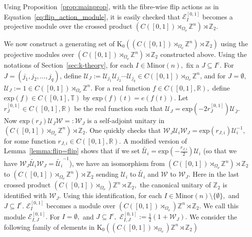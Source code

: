 \documentclass[9pt, BCOR=2mm]{amsart}
\numberwithin{equation}{section}
\numberwithin{equation}{section}
\newcommand{\Z}{{\mathbb{Z}}}
\newcommand{\R}{{\mathbb{R}}}
\newcommand{\T}{{\mathbb{T}}}
\newcommand{\K}{\mathrm{K}} %
\begin{document}
  
  
  Using Proposition~\ref{prop:mainprop}, with the fibre-wise flip actions as in Equation~\ref{eq:flip_action_module}, it is easily checked that $\mathcal{E}_{I}^{[0,1]}$ becomes a projective module over the crossed product $(C([0,1])\rtimes_{ \Omega_{\nu}} \Z^n)\rtimes \Z_2.$      
  
We now construct a generating set of $\K_0((C([0,1])\rtimes_{ \Omega_{\nu}} \Z^n)\rtimes \Z_2)$ using the projective modules over $(C([0,1])\rtimes_{ \Omega_{\nu}} \Z^n)\rtimes \Z_2$ constructed above. Using the notations of Section~\ref{sec:k-theory}, for each $I\in \mathrm{Minor}(n),$ fix a $J\subseteq I^c.$ For $J=(j_1,j_2,\dots,j_q)$, define $\mathcal{U}_J:=\mathcal{U}_{j_1}\mathcal{U}_{j_2}\cdots \mathcal{U}_{j_q}\in C([0,1])\rtimes_{\Omega_{\nu}} \Z^n$, and for $J=\emptyset,$ $\mathcal{U}_J:=1\in C([0,1])\rtimes_{\Omega_{\nu}} \Z^n.$ For a real function $f \in C([0,1],\R),$ define $\mathrm{exp}(f)\in C([0,1],\T)$ by $\mathrm{exp}(f)(t)=e(f(t)).$ Let $r_J^{[0,1]}\in C([0,1],\R)$ be the real function such that $\mathcal{U}_J=\mathrm{exp}(-2r^{[0,1]}_J)\mathcal{U}_{\bar{J}}.$  Now $\mathrm{exp}(r_J)\mathcal{U}_J\mathcal{W}=:\mathcal{W}_J$ is a self-adjoint unitary in $(C([0,1])\rtimes_{\Omega_{\nu}} \Z^n)\rtimes \Z_2.$ One quickly checks that  $\mathcal{W}_J\mathcal{U}_{i}\mathcal{W}_J=\mathrm{exp}(r_{J,i})\mathcal{U}_{i}^{-1},$ for some function $r_{J,i}\in C([0,1],\R).$ A modified version of Lemma~\ref{lemma:flip=flip} shows that if we set $\widetilde{\mathcal{U}_{i}}=\mathrm{exp}(-\frac{r_{J,i}}{2})\mathcal{U}_{i}$ (so that we have  $\mathcal{W}_J\widetilde{\mathcal{U}_{i}}\mathcal{W}_J=\widetilde{\mathcal{U}_{i}}^{-1}$), we have an isomorphism from $(C([0,1])\rtimes_{\Omega_{\nu}} \Z^n)\rtimes \Z_2$ to $(C([0,1])\rtimes_{\Omega_{\nu}} \Z^n)\rtimes \Z_2$ sending $\mathcal{U}_i$ to $\widetilde{\mathcal{U}_{i}}$ and $\mathcal{W}$ to $\mathcal{W}_J.$ Here in the last crossed product $(C([0,1])\rtimes_{\Omega_{\nu}}) \Z^n\rtimes \Z_2,$ the canonical unitary of $\Z_2$ is identified with $\mathcal{W}_J.$ Using this identification, for each $I\in \mathrm{Minor}(n)\setminus\{\emptyset\},$ and $J\subseteq I^c.$  $\mathcal{E}_{I}^{[0,1]}$ becomes a module over $(C([0,1])\rtimes_{\Omega_{\nu}}) \Z^n\rtimes \Z_2.$ We call this module $\mathcal{E}_{I,J}^{[0,1]}.$ For $I=\emptyset,$ and $J\subseteq I^c,$  $\mathcal{E}_{I,J}^{[0,1]}:=\frac{1}{2}(1+\mathcal{W}_J).$ 
	  We consider the following family of elements in $\K_0((C([0,1])\rtimes_{\Omega_{\nu}}) \Z^n\rtimes \Z_2)$ 
	  
\end{document}

